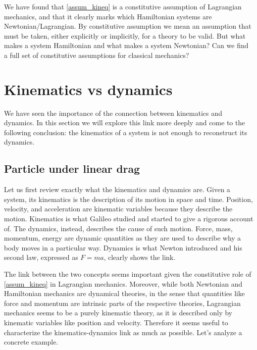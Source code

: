 We have found that \ref{assum_kineq} is a constitutive assumption of Lagrangian mechanics, and that it clearly marks which Hamiltonian systems are Newtonian/Lagrangian. By constitutive assumption we mean an assumption that must be taken, either explicitly or implicitly, for a theory to be valid. But what makes a system Hamiltonian and what makes a system Newtonian? Can we find a full set of constitutive assumptions for classical mechanics?

\section{Kinematics vs dynamics}

We have seen the importance of the connection between kinematics and dynamics. In this section we will explore this link more deeply and come to the following conclusion: the kinematics of a system is not enough to reconstruct its dynamics. 

\subsection{Particle under linear drag}

Let us first review exactly what the kinematics and dynamics are. Given a system, its kinematics is the description of its motion in space and time. Position, velocity, and acceleration are kinematic variables because they describe the motion. Kinematics is what Galileo studied and started to give a rigorous account of. The dynamics, instead, describes the cause of such motion. Force, mass, momentum, energy are dynamic quantities as they are used to describe why a body moves in a particular way. Dynamics is what Newton introduced and his second law, expressed as $F=ma$, clearly shows the link.

The link between the two concepts seems important given the constitutive role of \ref{assum_kineq} in Lagrangian mechanics. Moreover, while both Newtonian and Hamiltonian mechanics are dynamical theories, in the sense that quantities like force and momentum are intrinsic parts of the respective theories, Lagrangian mechanics seems to be a purely kinematic theory, as it is described only by kinematic variables like position and velocity. Therefore it seems useful to characterize the kinematics-dynamics link as much as possible. Let's analyze a concrete example.


